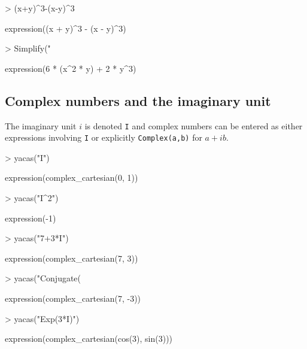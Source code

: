 \documentclass[10pt]{article}
\newcommand{\code}[1]{{\tt #1}}
\begin{document}
\begin{Schunk}
\begin{Sinput}
> (x+y)^3-(x-y)^3
\end{Sinput}
\begin{Soutput}
expression((x + y)^3 - (x - y)^3)
\end{Soutput}
\begin{Sinput}
> Simplify("%")
\end{Sinput}
\begin{Soutput}
expression(6 * (x^2 * y) + 2 * y^3)
\end{Soutput}
\end{Schunk}



\subsection{Complex numbers and the imaginary unit}

The imaginary unit $i$ is denoted \verb'I' and complex numbers can be
entered as either expressions involving \verb'I' or explicitly
\code{Complex(a,b)}
for $a+ib$.
\begin{Schunk}
\begin{Sinput}
> yacas("I")
\end{Sinput}
\begin{Soutput}
expression(complex_cartesian(0, 1))
\end{Soutput}
\begin{Sinput}
> yacas("I^2")
\end{Sinput}
\begin{Soutput}
expression(-1)
\end{Soutput}
\begin{Sinput}
> yacas("7+3*I")
\end{Sinput}
\begin{Soutput}
expression(complex_cartesian(7, 3))
\end{Soutput}
\begin{Sinput}
> yacas("Conjugate(%)")
\end{Sinput}
\begin{Soutput}
expression(complex_cartesian(7, -3))
\end{Soutput}
\begin{Sinput}
> yacas("Exp(3*I)")
\end{Sinput}
\begin{Soutput}
expression(complex_cartesian(cos(3), sin(3)))
\end{Soutput}
\end{Schunk}
\end{document}
